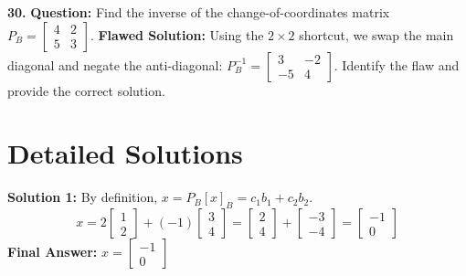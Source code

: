 \documentclass{article}
\begin{document}
\vspace{0.2cm}
\textbf{30.} \textbf{Question:} Find the inverse of the change-of-coordinates matrix $P_B = \begin{bmatrix} 4 & 2 \\ 5 & 3 \end{bmatrix}$.
\newline \textbf{Flawed Solution:} Using the $2 \times 2$ shortcut, we swap the main diagonal and negate the anti-diagonal: $P_B^{-1} = \begin{bmatrix} 3 & -2 \\ -5 & 4 \end{bmatrix}$.
\newline Identify the flaw and provide the correct solution.

\newpage

\section{Detailed Solutions}

\textbf{Solution 1:} By definition, $x = P_B[x]_B = c_1b_1 + c_2b_2$.
\[ x = 2 \begin{bmatrix} 1 \\ 2 \end{bmatrix} + (-1) \begin{bmatrix} 3 \\ 4 \end{bmatrix} = \begin{bmatrix} 2 \\ 4 \end{bmatrix} + \begin{bmatrix} -3 \\ -4 \end{bmatrix} = \begin{bmatrix} -1 \\ 0 \end{bmatrix} \]
\textbf{Final Answer:} $x = \begin{bmatrix} -1 \\ 0 \end{bmatrix}$
\end{document}
